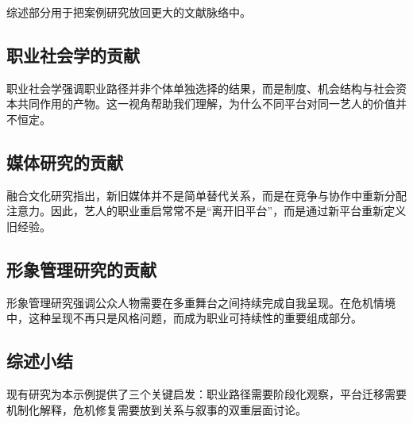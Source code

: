 综述部分用于把案例研究放回更大的文献脉络中。

\subsection{职业社会学的贡献}

职业社会学强调职业路径并非个体单独选择的结果，而是制度、机会结构与社会资本共同作用的产物\cite{Super1957,Bourdieu1986}。这一视角帮助我们理解，为什么不同平台对同一艺人的价值并不恒定。

\subsection{媒体研究的贡献}

融合文化研究指出，新旧媒体并不是简单替代关系，而是在竞争与协作中重新分配注意力\cite{Jenkins2006}。因此，艺人的职业重启常常不是“离开旧平台”，而是通过新平台重新定义旧经验。

\subsection{形象管理研究的贡献}

形象管理研究强调公众人物需要在多重舞台之间持续完成自我呈现\cite{Goffman1959}。在危机情境中，这种呈现不再只是风格问题，而成为职业可持续性的重要组成部分。

\subsection{综述小结}

现有研究为本示例提供了三个关键启发：职业路径需要阶段化观察，平台迁移需要机制化解释，危机修复需要放到关系与叙事的双重层面讨论。
